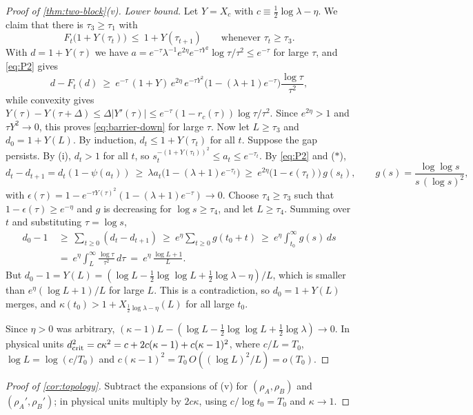 \begin{proof}[Proof of \cref{thm:two-block}(v)]
\emph{Lower bound.} Let $Y=X_c$ with $c\equiv\frac12\log\lambda-\eta$. We claim that there is $\tau_3\ge\tau_1$ with
\begin{equation}\label{eq:barrier-down}
F_t\big(1+Y(\tau_t)\big)\ \le\ 1+Y(\tau_{t+1})\qquad\text{whenever }\tau_t\ge\tau_3 .
\end{equation}
With $d=1+Y(\tau)$ we have $a=e^{-\tau}\lambda^{-1}e^{2\eta}e^{-\tau Y^2}\log\tau/\tau^2\le e^{-\tau}$ for large $\tau$, and \eqref{eq:P2} gives
\[
d-F_t(d)\ \ge\ e^{-\tau}\,(1+Y)\,e^{2\eta}\,e^{-\tau Y^2}\big(1-(\lambda+1)e^{-\tau}\big)\frac{\log\tau}{\tau^2},
\]
while convexity gives $Y(\tau)-Y(\tau+\Delta)\le\Delta|Y'(\tau)|\le e^{-\tau}(1-r_c(\tau))\log\tau/\tau^2$. Since $e^{2\eta}>1$ and $\tau Y^2\to0$, this
proves \eqref{eq:barrier-down} for large $\tau$. Now let $L\ge\tau_3$ and $d_0=1+Y(L)$. By induction, $d_t\le1+Y(\tau_t)$ for all $t$. Suppose
the gap persists. By (i), $d_t>1$ for all $t$, so $s_t^{-(1+Y(\tau_t))^2}\le a_t\le e^{-\tau_t}$. By \eqref{eq:P2} and ($*$),
\[
d_t-d_{t+1}=d_t(1-\psi(a_t))\ \ge\ \lambda a_t\big(1-(\lambda+1)e^{-\tau_t}\big)\ \ge\ e^{2\eta}\big(1-\epsilon(\tau_t)\big)\,g(s_t),
\qquad g(s)=\frac{\log\log s}{s\,(\log s)^2},
\]
with $\epsilon(\tau)=1-e^{-\tau Y(\tau)^2}(1-(\lambda+1)e^{-\tau})\to0$. Choose $\tau_4\ge\tau_3$ such that $1-\epsilon(\tau)\ge e^{-\eta}$ and $g$ is
decreasing for $\log s\ge\tau_4$, and let $L\ge\tau_4$. Summing over $t$ and substituting $\tau=\log s$,
\begin{align*}
d_0-1&\ \ge\ \sum_{t\ge0}(d_t-d_{t+1})\ \ge\ e^{\eta}\sum_{t\ge0}g(t_0+t)\ \ge\ e^{\eta}\int_{t_0}^\infty g(s)\,ds\\
&\ =\ e^{\eta}\int_L^\infty\frac{\log\tau}{\tau^2}\,d\tau\ =\ e^{\eta}\,\frac{\log L+1}{L}.
\end{align*}
But $d_0-1=Y(L)=(\log L-\frac12\log\log L+\frac12\log\lambda-\eta)/L$, which is smaller than $e^\eta(\log L+1)/L$ for large $L$. This is a
contradiction, so $d_0=1+Y(L)$ merges, and $\kappa(t_0)>1+X_{\frac12\log\lambda-\eta}(L)$ for all large $t_0$.

Since $\eta>0$ was arbitrary, $(\kappa-1)L-(\log L-\frac12\log\log L+\frac12\log\lambda)\to0$. In physical units
$d_{\rm crit}^2=c\kappa^2=c+2c(\kappa-1)+c(\kappa-1)^2$, where $c/L=T_0$, $\log L=\log(c/T_0)$ and $c(\kappa-1)^2=T_0\,O((\log L)^2/L)=o(T_0)$.
\end{proof}

\begin{proof}[Proof of \cref{cor:topology}]
Subtract the expansions of (v) for $(\rho_A,\rho_B)$ and $(\rho_A',\rho_B')$; in physical units multiply by $2c\kappa$, using
$c/\log t_0=T_0$ and $\kappa\to1$.
\end{proof}

